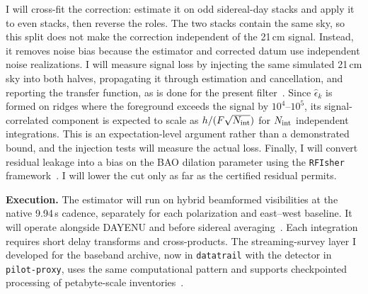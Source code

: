 \documentclass[12pt]{article}
\begin{document}
I will cross-fit the correction: estimate it on odd sidereal-day stacks and apply it to even stacks, then reverse the roles. The two stacks contain the same sky, so this split does not make the correction independent of the 21\,cm signal. Instead, it removes noise bias because the estimator and corrected datum use independent noise realizations. I will measure signal loss by injecting the same simulated 21\,cm sky into both halves, propagating it through estimation and cancellation, and reporting the transfer function, as is done for the present filter~\cite[Sec.~3.2.3; Eqs.~(17)--(19); Sec.~5.3, Eq.~(37), Fig.~10]{chime2025auto}. Since $\hat\epsilon_k$ is formed on ridges where the foreground exceeds the signal by $10^4$--$10^5$, its signal-correlated component is expected to scale as $h/(F\sqrt{N_{\rm int}})$ for $N_{\rm int}$ independent integrations. This is an expectation-level argument rather than a demonstrated bound, and the injection tests will measure the actual loss. Finally, I will convert residual leakage into a bias on the BAO dilation parameter using the \texttt{RFIsher} framework~\cite{gormley2026b}. I will lower the cut only as far as the certified residual permits.

\textbf{Execution.} The estimator will run on hybrid beamformed visibilities at the native 9.94\,s cadence, separately for each polarization and east--west baseline. It will operate alongside DAYENU and before sidereal averaging~\cite[Sec.~2.3; Sec.~3.2.2, Eq.~(9); Sec.~3.2.3, Eqs.~(17)--(18)]{chime2025auto}. Each integration requires short delay transforms and cross-products. The streaming-survey layer I developed for the baseband archive, now in \texttt{datatrail} with the detector in \texttt{pilot-proxy}, uses the same computational pattern and supports checkpointed processing of petabyte-scale inventories~\cite{gormley2026a}.
\end{document}
